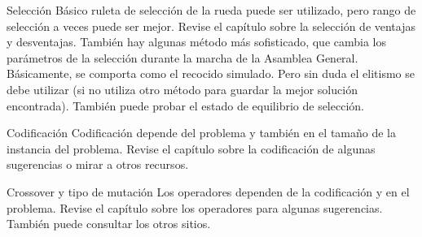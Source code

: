 \documentclass[12pt]{article}
\begin{document}
Selección
Básico ruleta de selección de la rueda puede ser utilizado, pero rango de selección a veces puede ser mejor. Revise el capítulo sobre la selección de ventajas y desventajas. También hay algunas método más sofisticado, que cambia los parámetros de la selección durante la marcha de la Asamblea General. Básicamente, se comporta como el recocido simulado. Pero sin duda el elitismo se debe utilizar (si no utiliza otro método para guardar la mejor solución encontrada). También puede probar el estado de equilibrio de selección.

Codificación
Codificación depende del problema y también en el tamaño de la instancia del problema. Revise el capítulo sobre la codificación de algunas sugerencias o mirar a otros recursos.

Crossover y tipo de mutación
Los operadores dependen de la codificación y en el problema. Revise el capítulo sobre los operadores para algunas sugerencias. También puede consultar los otros sitios.
\end{document}
